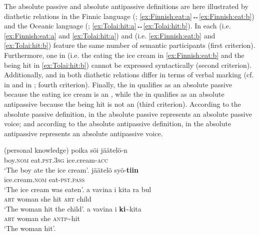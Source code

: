 \smallskip

The absolute passive and absolute antipassive definitions are here illustrated by diathetic relations in the Finnic language  (; \ref{ex:Finnish:eat:a}↔\ref{ex:Finnish:eat:b}) and the Oceanic language  (; \ref{ex:Tolai:hit:a}↔\ref{ex:Tolai:hit:b}). In each   (i.e. \ref{ex:Finnish:eat:a} and \ref{ex:Tolai:hit:a}) and  (i.e. \ref{ex:Finnish:eat:b} and \ref{ex:Tolai:hit:b}) feature the same number of semantic participants (first criterion). Furthermore, one  in  (i.e. the  eating the ice cream in \ref{ex:Finnish:eat:b} and the  being hit in \ref{ex:Tolai:hit:b}) cannot be expressed syntactically (second criterion). Additionally,  and  in both diathetic relations differ in terms of verbal marking (cf.  in  and  in ; fourth criterion). Finally, the  in  qualifies as an absolute passive  because the  eating ice cream is an , while the  in  qualifies as an absolute antipassive  because the  being hit is not an  (third criterion). According to the absolute passive definition,  in the  absolute passive  represents an absolute passive voice; and according to the absolute antipassive definition,  in the  absolute antipassive  represents an absolute antipassive voice.

\ea {} (personal knowledge)
	\ea\label{ex:Finnish:eat:a}
	\gll	poika				söi						jäätelö-n				\\
			boy.\textsc{nom}	eat.\textsc{pst.3sg}	ice.cream-\textsc{acc}	\\
	\glt	‘The boy ate the ice cream’.
	\ex\label{ex:Finnish:eat:b}
	\gll	jäätelö					syö-\textbf{tiin}		\\
			ice.cream.\textsc{nom}	eat-\textsc{pst.pass}	\\
	\glt	‘The ice cream was eaten’.
	\z
\z
\ea {} \citep[248]{mosel:1991}
	\ea\label{ex:Tolai:hit:a}
	\gll	a				vavina	i	kita	ra				bul 	\\
			\textsc{art}	woman	she	hit		\textsc{art}	child	\\
	\glt	‘The woman hit the child’.
	\ex\label{ex:Tolai:hit:b}
	\gll	a				vavina	i	\textbf{ki}\~{}kita	\\
			\textsc{art}	woman	she	\textsc{antp}\~{}hit				\\
	\glt	‘The woman hit’.
	\z
\z

